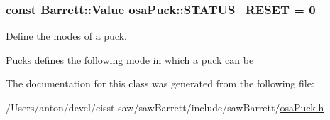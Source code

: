 \subsubsection[{S\+T\+A\+T\+U\+S\+\_\+\+R\+E\+S\+E\+T}]{\setlength{\rightskip}{0pt plus 5cm}const {\bf Barrett\+::\+Value} osa\+Puck\+::\+S\+T\+A\+T\+U\+S\+\_\+\+R\+E\+S\+E\+T = 0\hspace{0.3cm}{\ttfamily [static]}}\label{classosa_puck_ada7927c208d1f07285d12074998bbf4c}


Define the modes of a puck. 

Pucks defines the following mode in which a puck can be 

The documentation for this class was generated from the following file\+:\begin{DoxyCompactItemize}
\item 
/\+Users/anton/devel/cisst-\/saw/saw\+Barrett/include/saw\+Barrett/\hyperlink{osa_puck_8h}{osa\+Puck.\+h}\end{DoxyCompactItemize}
